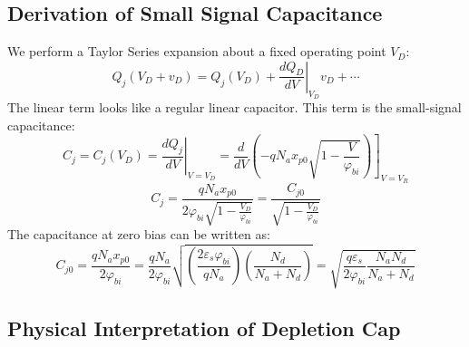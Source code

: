 \subsection{Derivation of Small Signal Capacitance}

We perform a Taylor Series expansion about a fixed operating point $V_D$:
\begin{equation} 
	{Q_j}({V_D} + {v_D}) = {Q_j}({V_D}) + {\left. {\frac{{d{Q_D}}}{{dV}}} \right|_{{V_D}}}{v_D} +  \cdots 
\end{equation}
The linear term looks like a regular linear capacitor.  This term is the small-signal capacitance:
\begin{equation} 
	C_j^{} = {C_j}({V_D}) = {\left. {\frac{{dQ_j^{}}}{{dV}}} \right|_{V = {V_D}}} = {\left. {\frac{d}{{dV}}\left( { - q{N_a}{x_{p0}}\sqrt {1 - \frac{V}{{{\varphi _{bi}}}}} } \right)} \right]_{V = {V_R}}} 
\end{equation}
%
\begin{equation} {C_j} = \frac{{q{N_a}{x_{p0}}}}{{2{\varphi _{bi}}\sqrt {1 - \frac{{{V_D}}}{{{\varphi _{bi}}}}} }} = \frac{{C_{j0}^{}}}{{\sqrt {1 - \frac{{{V_D}}}{{{\varphi _{bi}}}}} }} 
\end{equation}
%
The capacitance at zero bias can be written as:
% 
\begin{equation} 
{C_{j0}} = \frac{{q{N_a}{x_{p0}}}}{{2{\varphi _{bi}}}} = \frac{{q{N_a}}}{{2{\varphi _{bi}}}}\sqrt {\left( {\frac{{2{\varepsilon _s}{\varphi _{bi}}}}{{q{N_a}}}} \right)\left( {\frac{{{N_d}}}{{{N_a} + {N_d}}}} \right)}  = \sqrt {\frac{{q{\varepsilon _s}}}{{2{\varphi _{bi}}}}\frac{{{N_a}{N_d}}}{{{N_a} + {N_d}}}} 
\end{equation} \label{eq:cj0}





\subsection{Physical Interpretation of Depletion Cap}

